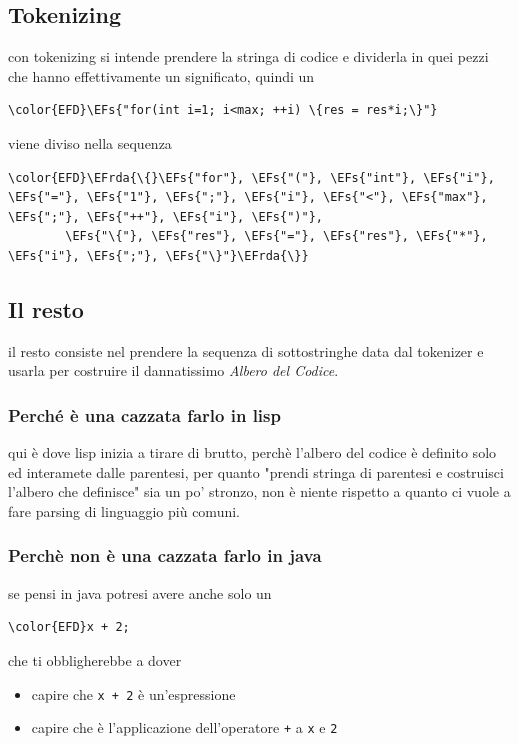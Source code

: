 \documentclass[11pt]{article}
\newcommand{\EFs}[1]{\textcolor{EFs}{#1}} %
\newcommand{\EFrda}[1]{\textcolor{EFrda}{#1}} %
\begin{document}
\subsection{Tokenizing}
\label{sec:orgaaa828a}
con tokenizing si intende prendere la stringa di codice e dividerla in quei pezzi che hanno effettivamente un significato, quindi un
\begin{Code}
\begin{Verbatim}
\color{EFD}\EFs{"for(int i=1; i<max; ++i) \{res = res*i;\}"}
\end{Verbatim}
\end{Code}
viene diviso nella sequenza
\begin{Code}
\begin{Verbatim}
\color{EFD}\EFrda{\{}\EFs{"for"}, \EFs{"("}, \EFs{"int"}, \EFs{"i"}, \EFs{"="}, \EFs{"1"}, \EFs{";"}, \EFs{"i"}, \EFs{"<"}, \EFs{"max"}, \EFs{";"}, \EFs{"++"}, \EFs{"i"}, \EFs{")"},
        \EFs{"\{"}, \EFs{"res"}, \EFs{"="}, \EFs{"res"}, \EFs{"*"}, \EFs{"i"}, \EFs{";"}, \EFs{"\}"}\EFrda{\}}
\end{Verbatim}
\end{Code}

\subsection{Il resto}
\label{sec:org49ebe70}
il resto consiste nel prendere la sequenza di sottostringhe data dal tokenizer e usarla per costruire il dannatissimo \emph{Albero del Codice}.

\subsubsection{Perché è una cazzata farlo in lisp}
\label{sec:orgbcad72c}
qui è dove lisp inizia a tirare di brutto, perchè l'albero del codice è definito solo ed interamete dalle parentesi, per quanto "prendi stringa di parentesi e costruisci l'albero che definisce" sia un po' stronzo, non è niente rispetto a quanto ci vuole a fare parsing di linguaggio più comuni.

\subsubsection{Perchè non è una cazzata farlo in java}
\label{sec:orgecd541b}
se pensi in java potresi avere anche solo un
\begin{Code}
\begin{Verbatim}
\color{EFD}x + 2;
\end{Verbatim}
\end{Code}
che ti obbligherebbe a dover
\begin{itemize}
\item capire che \texttt{x + 2} è un'espressione
\item capire che è l'applicazione dell'operatore \texttt{+} a \texttt{x} e \texttt{2}
\end{itemize}
\end{document}

